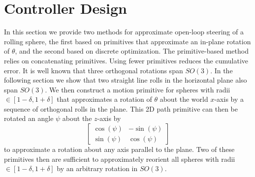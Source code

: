 \documentclass[letter paper, 10pt, conference]{ieeeconf}
\begin{document}
 \section{Controller Design}\label{sec:ControllerDesign}
%
%		
%		
%		
%		
 
 In this section we provide two methods for approximate open-loop steering of a rolling sphere, the first based on primitives that approximate an in-plane rotation of $\theta$, and the second based on discrete optimization.   The primitive-based method relies on concatenating primitives.  Using fewer primitives reduces the cumulative error. It is well known that three orthogonal rotations span $SO(3)$.  In the following section we show that two straight line rolls in the horizontal plane also span $SO(3)$.  We then construct a motion primitive for spheres with radii $\in [1-\delta,1+\delta]$ that approximates a rotation of $\theta$ about the world $x$-axis by a sequence of orthogonal rolls in the plane.  
 This 2D path primitive can then be rotated an angle $\psi$ about the $z$-axis by  \[\begin{bmatrix} \cos(\psi) & -\sin(\psi)\\ \sin(\psi) & \cos(\psi) \end{bmatrix}\] to approximate a rotation about any axis parallel to the plane.
 Two of these primitives then are sufficient to approximately reorient all spheres with radii $\in [1-\delta,1+\delta]$ by an arbitrary rotation in $SO(3)$.
 
\end{document}
